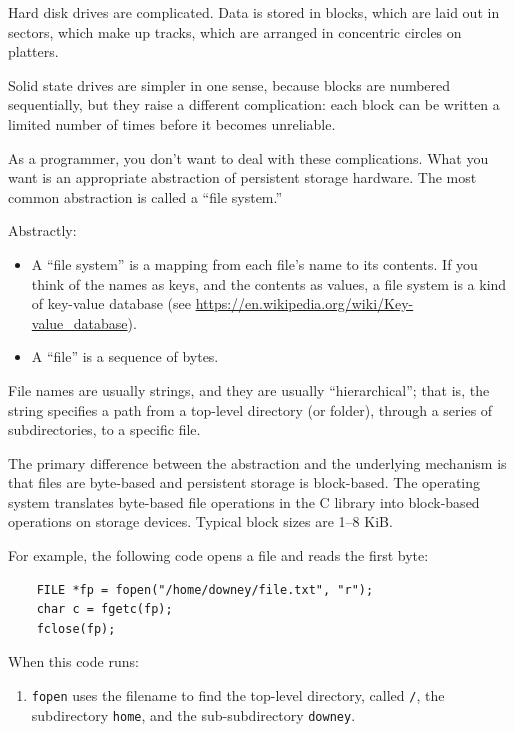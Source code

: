 \documentclass[12pt]{book}
\begin{document}
{Hard disk drives are complicated.  Data is stored in blocks, which
are laid out in sectors, which make up tracks, which are arranged
in concentric circles on platters.

Solid state drives are simpler in one sense, because blocks are
numbered sequentially, but they raise a different complication: each
block can be written a limited number of times before it becomes
unreliable.

As a programmer, you don't want to deal with these complications.
What you want is an appropriate abstraction of persistent storage
hardware.  The most common abstraction is called a ``file system.''

Abstractly:

\begin{itemize}

\item A ``file system'' is a mapping from each file's name to its contents.
If you think of the names as keys, and the contents as values,
a file system is a kind of key-value database
(see \url{https://en.wikipedia.org/wiki/Key-value_database}).

\item A ``file'' is a sequence of bytes.

\end{itemize}

File names are usually strings, and they are usually ``hierarchical'';
that is, the string specifies a path from a top-level directory (or
folder), through a series of subdirectories, to a specific file.

The primary difference between the abstraction and the underlying
mechanism is that files are byte-based and persistent storage is
block-based.  The operating system translates byte-based file operations 
in the C library into block-based operations on storage devices.
Typical block sizes are 1--8 KiB.

For example, the following code opens a file and reads the first byte:

\begin{verbatim}
    FILE *fp = fopen("/home/downey/file.txt", "r");
    char c = fgetc(fp);
    fclose(fp);
\end{verbatim}

When this code runs:

\begin{enumerate}

\item {\tt fopen} uses the filename to find the top-level directory,
  called \verb"/", the subdirectory {\tt home}, and the
  sub-subdirectory {\tt downey}.


\end{enumerate}}
\end{document}
